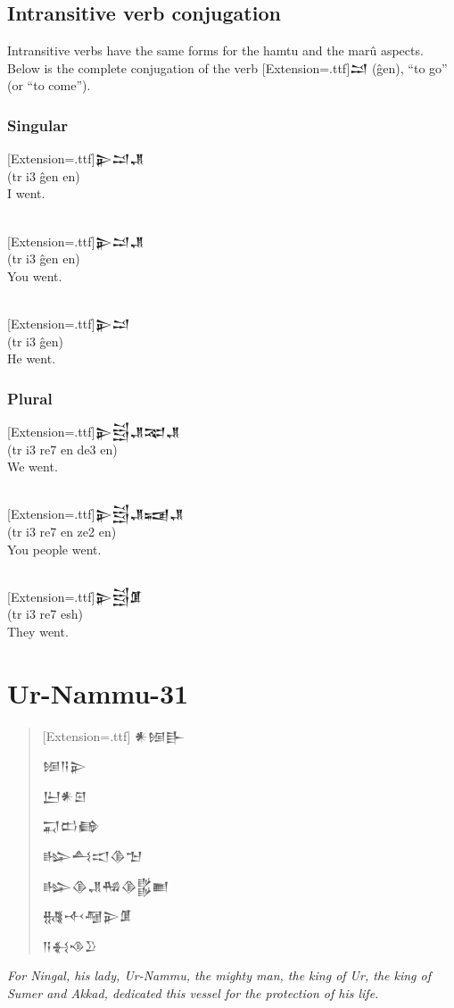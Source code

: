 \documentclass[a4paper,12pt]{book}
\newcommand{\fcn}{\setmainfont{Akkadian}[Extension=.ttf]}
\newcommand{\fsm}{\Large\setmainfont{Akkadian}[Extension=.ttf]}
\begin{document}
\newpage
\section*{Intransitive verb conjugation}
Intransitive verbs have the same forms
for the hamtu and the marû aspects.
Below is the complete conjugation
of the verb {\fcn 𒁺} (ĝen),
``to go'' (or ``to come'').

\subsection*{Singular}
{\fsm 𒉌𒁺𒂗}\\
(tr i3 ĝen en)\\
I went.

\verb||\\
{\fsm 𒉌𒁺𒂗}\\
(tr i3 ĝen en)\\
You went.

\verb||\\
{\fsm 𒉌𒁺}\\
(tr i3 ĝen)\\
He went.

\subsection*{Plural}
{\fsm 𒉌𒁻𒂗𒉈𒂗}\\
(tr i3 re7 en de3 en)\\
We went.

\verb||\\
{\fsm 𒉌𒁻𒂗𒍢𒂗}\\
(tr i3 re7 en ze2 en)\\
You people went.

\verb||\\
{\fsm 𒉌𒁻𒂠}\\
(tr i3 re7 esh)\\
They went.


\chapter{Ur-Nammu-31}
\begin{quotation}\fsm
𒀭𒎏𒃲
  
𒎏𒀀𒉌

𒌨𒀭𒇉

𒍑𒆗𒂵

𒈗𒋀𒀊𒆠𒈠

𒈗𒆠𒂗𒄀𒆠𒌵𒆤

𒉆𒋾𒆷𒉌𒂠

𒀀𒈬𒈾𒊒
\end{quotation}
{\em For Ningal, his lady, Ur-Nammu,
  the mighty man, the king of Ur,
  the king of Sumer and Akkad,
  dedicated this vessel for the protection of his life.}
\end{document}
